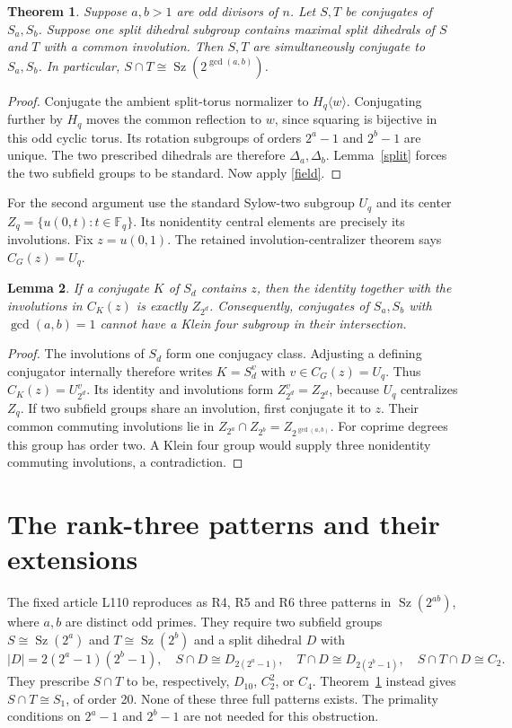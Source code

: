 \documentclass[11pt,a4paper]{article}
\newtheorem{lemma}{Lemma}\newtheorem{theorem}[lemma]{Theorem}
\newcommand{\Sz}{\operatorname{Sz}}
\newcommand{\gen}[1]{\langle#1\rangle}
\begin{document}
\begin{theorem}\label{alignment}
Suppose $a,b>1$ are odd divisors of $n$. Let $S,T$ be conjugates of
$S_a,S_b$. Suppose one split dihedral subgroup contains maximal split
dihedrals of $S$ and $T$ with a common involution. Then $S,T$ are
simultaneously conjugate to $S_a,S_b$. In particular,
$S\cap T\cong\Sz(2^{\gcd(a,b)})$.
\end{theorem}
\begin{proof}
Conjugate the ambient split-torus normalizer to $H_q\gen w$.
Conjugating further by $H_q$ moves the common reflection to $w$,
since squaring is bijective in this odd cyclic torus. Its rotation
subgroups of orders $2^a-1$ and $2^b-1$ are unique. The two prescribed
dihedrals are therefore $\Delta_a,\Delta_b$. Lemma~\ref{split} forces the two
subfield groups to be standard. Now apply \eqref{field}.
\end{proof}

For the second argument use the standard Sylow-two subgroup $U_q$ and
its center $Z_q=\{u(0,t):t\in\mathbb F_q\}$. Its nonidentity central
elements are precisely its involutions. Fix $z=u(0,1)$.
The retained involution-centralizer theorem says $C_G(z)=U_q$.

\begin{lemma}\label{center}
If a conjugate $K$ of $S_d$ contains $z$, then the identity together
with the involutions in $C_K(z)$ is exactly $Z_{2^d}$.
Consequently, conjugates of $S_a,S_b$ with $\gcd(a,b)=1$ cannot
have a Klein four subgroup in their intersection.
\end{lemma}
\begin{proof}
The involutions of $S_d$ form one conjugacy class. Adjusting a defining
conjugator internally therefore writes $K=S_d^v$ with
$v\in C_G(z)=U_q$. Thus $C_K(z)=U_{2^d}^v$. Its identity and
involutions form $Z_{2^d}^v=Z_{2^d}$, because $U_q$ centralizes $Z_q$.
If two subfield groups share an involution, first conjugate it to $z$.
Their common commuting involutions lie in
$Z_{2^a}\cap Z_{2^b}=Z_{2^{\gcd(a,b)}}$.
For coprime degrees this group has order two. A Klein four group would
supply three nonidentity commuting involutions, a contradiction.
\end{proof}

\section{The rank-three patterns and their extensions}
The fixed article L110 reproduces as R4, R5 and R6 three patterns in
$\Sz(2^{ab})$, where $a,b$ are distinct odd primes. They require
two subfield groups $S\cong\Sz(2^a)$ and $T\cong\Sz(2^b)$ and a
split dihedral $D$ with
\[
 |D|=2(2^a-1)(2^b-1),\quad
 S\cap D\cong D_{2(2^a-1)},\quad
 T\cap D\cong D_{2(2^b-1)},\quad
 S\cap T\cap D\cong C_2.
\]
They prescribe $S\cap T$ to be, respectively, $D_{10}$,
$C_2^2$, or $C_4$. Theorem~\ref{alignment} instead gives
$S\cap T\cong S_1$, of order 20. None of these three full patterns exists.
The primality conditions on $2^a-1$ and $2^b-1$ are not needed for this
obstruction.
\end{document}
